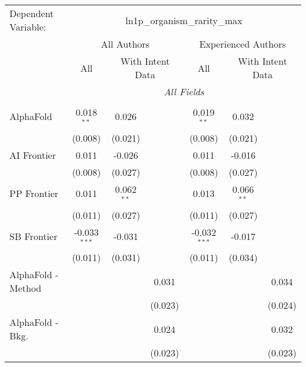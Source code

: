 \begingroup
\centering
\begin{tabular}{lcccccc}
   \tabularnewline \midrule \midrule
   Dependent Variable: & \multicolumn{6}{c}{ln1p\_organism\_rarity\_max}\\
 & \multicolumn{3}{c}{All Authors} & \multicolumn{3}{c}{Experienced Authors} \\
\cmidrule(lr){2-4} \cmidrule(lr){5-7}
 & \multicolumn{1}{c}{All} & \multicolumn{2}{c}{With Intent Data} & \multicolumn{1}{c}{All} & \multicolumn{2}{c}{With Intent Data} \\
\cmidrule(lr){2-2} \cmidrule(lr){3-4} \cmidrule(lr){5-5} \cmidrule(lr){6-7}
 & \multicolumn{6}{c}{\textit{All Fields}} \\ \\
   AlphaFold            & 0.018$^{**}$   & 0.026        &               & 0.019$^{**}$   & 0.032        &   \\   
                        & (0.008)        & (0.021)      &               & (0.008)        & (0.021)      &   \\   
   AI Frontier          & 0.011          & -0.026       &               & 0.011          & -0.016       &   \\   
                        & (0.008)        & (0.027)      &               & (0.008)        & (0.027)      &   \\   
   PP Frontier          & 0.011          & 0.062$^{**}$ &               & 0.013          & 0.066$^{**}$ &   \\   
                        & (0.011)        & (0.027)      &               & (0.011)        & (0.027)      &   \\   
   SB Frontier          & -0.033$^{***}$ & -0.031       &               & -0.032$^{***}$ & -0.017       &   \\   
                        & (0.011)        & (0.031)      &               & (0.011)        & (0.034)      &   \\   
   AlphaFold - Method   &                &              & 0.031         &                &              & 0.034\\   
                        &                &              & (0.023)       &                &              & (0.024)\\   
   AlphaFold - Bkg.     &                &              & 0.024         &                &              & 0.032\\   
                        &                &              & (0.023)       &                &              & (0.023)\\   

\end{tabular}
